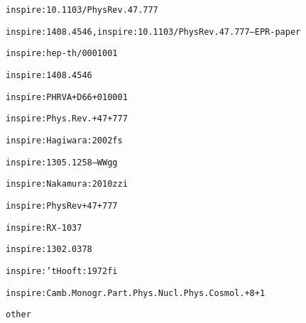 \documentclass[11pt,a4paper]{article}
\begin{document}

\texttt{inspire:10.1103/PhysRev.47.777}
  \cite{inspire:10.1103/PhysRev.47.777}


\texttt{inspire:1408.4546,inspire:10.1103/PhysRev.47.777--EPR-paper}
  \cite{inspire:1408.4546,inspire:10.1103/PhysRev.47.777--EPR-paper}


\texttt{inspire:hep-th/0001001}
  \cite{inspire:hep-th/0001001}

\texttt{inspire:1408.4546}
  \cite{inspire:1408.4546}

\texttt{inspire:PHRVA+D66+010001}
  \cite{inspire:PHRVA+D66+010001}

\texttt{inspire:Phys.Rev.+47+777}
  \cite{inspire:Phys.Rev.+47+777}

\texttt{inspire:Hagiwara:2002fs}
  \cite{inspire:Hagiwara:2002fs}


\texttt{inspire:1305.1258--WWgg}
  \cite{inspire:1305.1258--WWgg}

\texttt{inspire:Nakamura:2010zzi}
  \cite{inspire:Nakamura:2010zzi}

\texttt{inspire:PhysRev+47+777}
  \cite{inspire:PhysRev+47+777}

\texttt{inspire:RX-1037}
  \cite{inspire:RX-1037}

\texttt{inspire:1302.0378}
  \cite{inspire:1302.0378}

\texttt{inspire:'tHooft:1972fi}
  \cite{inspire:'tHooft:1972fi}

\texttt{inspire:Camb.Monogr.Part.Phys.Nucl.Phys.Cosmol.+8+1}
  \cite{inspire:Camb.Monogr.Part.Phys.Nucl.Phys.Cosmol.+8+1}

\texttt{other}
  \cite{other}




\end{document}
